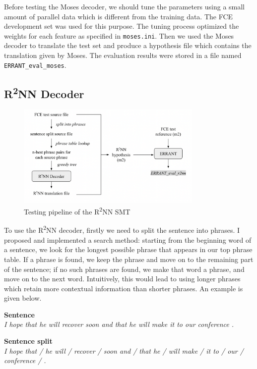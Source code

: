 \documentclass[12pt,a4paper,twoside]{report}
\begin{document}
Before testing the Moses decoder, we should tune the parameters using a small amount of parallel data which is different from the training data. The FCE development set was used for this purpose. The tuning process optimized the weights for each feature as specified in \texttt{moses.ini}. Then we used the Moses decoder to translate the test set and produce a hypothesis file which contains the translation given by Moses. The evaluation results were stored in a file named \texttt{ERRANT\_eval\_moses}.


\subsection{\texorpdfstring{R\textsuperscript{2}NN}{R2NN} Decoder}\label{section:r2nn_test}
\begin{figure}[ht]
\centering
\includegraphics[width=0.8\textwidth]{images/r2nn_test.png}
\caption{Testing pipeline of the R\textsuperscript{2}NN SMT}
\label{fig:r2nn_test}
\end{figure}

To use the R\textsuperscript{2}NN decoder, firstly we need to split the sentence into phrases. I proposed and implemented a search method: starting from the beginning word of a sentence, we look for the longest possible phrase that appears in our top phrase table. If a phrase is found, we keep the phrase and move on to the remaining part of the sentence; if no such phrases are found, we make that word a phrase, and move on to the next word. Intuitively, this would lead to using longer phrases which retain more contextual information than shorter phrases. An example is given below.

\hfill\begin{minipage}{\dimexpr\textwidth-0.8cm}
    \vspace*{1mm}
    \textbf{Sentence}\\
    \textit{I hope that he will recover soon and that he will make it to our conference .}

    \vspace*{1mm}

    \textbf{Sentence split}\\
    \textit{I hope that / he will / recover / soon and / that he / will make / it to / our / conference / .}
    \vspace*{1mm}
\end{minipage}
\end{document}

